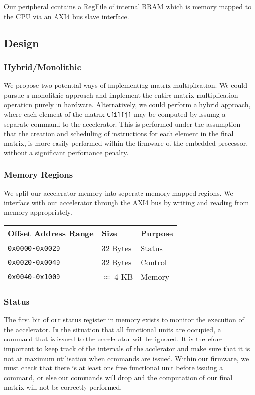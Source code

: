 \documentclass[a4paper,8pt]{report}
\begin{document}
Our peripheral contains a RegFile of internal BRAM which is memory mapped to
the CPU via an AXI4 bus slave interface. 

\subsection{Design}
\subsubsection{Hybrid/Monolithic}
We propose two potential ways of implementing matrix multiplication. We could
pursue a monolithic approach and implement the entire matrix multiplication
operation purely in hardware. Alternatively, we could perform a hybrid approach,
where each element of the matrix \texttt{C[i][j]} may be computed by issuing a
separate command to the accelerator. This is performed under the assumption that the
creation and scheduling of instructions for each element in the final matrix, is
more easily performed within the firmware of the embedded processor, without a
significant perfomance penalty.

\subsubsection{Memory Regions}
We split our accelerator memory into seperate memory-mapped regions. We
interface with our accelerator through the AXI4 bus by writing and reading from
memory appropriately.  
\begin{table}
  \centering
  \begin{tabular}{lll}
    \toprule
    Offset Address Range & Size & Purpose \\
    \midrule
    \texttt{0x0000-0x0020} & 32 Bytes & Status \\
    \texttt{0x0020-0x0040} & 32 Bytes & Control \\
    \texttt{0x0040-0x1000} & $\approx$ 4 KB & Memory \\
    \bottomrule
  \end{tabular}
\end{table}

\subsubsection{Status}
The first bit of our status register in memory exists to monitor the execution
of the accelerator. In the situation that all functional units are occupied, a
command that is issued to the accelerator will be ignored. It is therefore
important to keep track of the internals of the acclerator and make sure that it
is not at maximum utilisation when commands are issued. Within our firmware, we
must check that there is at least one free functional unit before issuing a
command, or else our commands will drop and the computation of our final matrix
will not be correctly performed.
\end{document}
